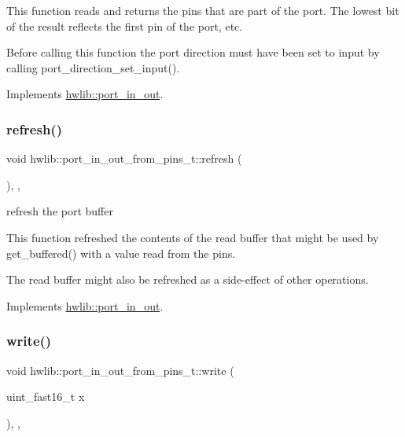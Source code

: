 This function reads and returns the pins that are part of the port. The lowest bit of the result reflects the first pin of the port, etc.

Before calling this function the port direction must have been set to input by calling port\+\_\+direction\+\_\+set\+\_\+input(). 

Implements \hyperlink{classhwlib_1_1port__in__out_a5f6662d6fccd2b256d20722a4f3e5840}{hwlib\+::port\+\_\+in\+\_\+out}.

\mbox{\label{classhwlib_1_1port__in__out__from__pins__t_a0a9b4ffd9faed2aaec708141e699545c}} 
\subsubsection{\texorpdfstring{refresh()}{refresh()}}
{\footnotesize\ttfamily void hwlib\+::port\+\_\+in\+\_\+out\+\_\+from\+\_\+pins\+\_\+t\+::refresh (\begin{DoxyParamCaption}{ }\end{DoxyParamCaption})\hspace{0.3cm}{\ttfamily [inline]}, {\ttfamily [override]}, {\ttfamily [virtual]}}

refresh the port buffer

This function refreshed the contents of the read buffer that might be used by get\+\_\+buffered() with a value read from the pins.

The read buffer might also be refreshed as a side-\/effect of other operations. 

Implements \hyperlink{classhwlib_1_1port__in__out_afa3680e36a05dd3f5a0eac1b63aac37c}{hwlib\+::port\+\_\+in\+\_\+out}.

\mbox{\label{classhwlib_1_1port__in__out__from__pins__t_a38b742fa3bcaa474b5beaeb71a5c364a}} 
\subsubsection{\texorpdfstring{write()}{write()}}
{\footnotesize\ttfamily void hwlib\+::port\+\_\+in\+\_\+out\+\_\+from\+\_\+pins\+\_\+t\+::write (\begin{DoxyParamCaption}\item[{uint\+\_\+fast16\+\_\+t}]{x }\end{DoxyParamCaption})\hspace{0.3cm}{\ttfamily [inline]}, {\ttfamily [override]}, {\ttfamily [virtual]}}

